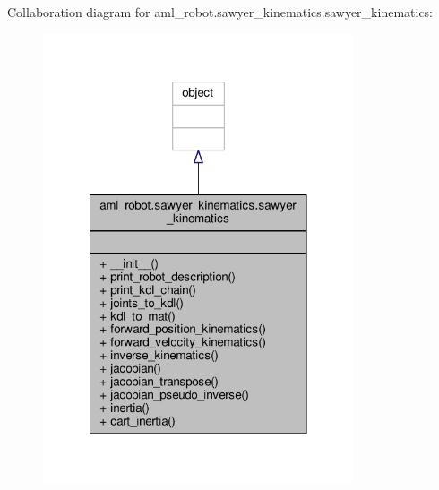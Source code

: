 Collaboration diagram for aml\-\_\-robot.\-sawyer\-\_\-kinematics.\-sawyer\-\_\-kinematics\-:
\nopagebreak
\begin{figure}[H]
\begin{center}
\leavevmode
\includegraphics[width=260pt]{classaml__robot_1_1sawyer__kinematics_1_1sawyer__kinematics__coll__graph}
\end{center}
\end{figure}
